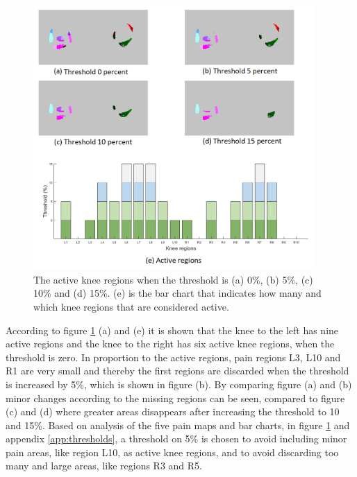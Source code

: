 \begin{figure} [H]
\centering
\includegraphics[width=0.95\textwidth]{figures/threshold4}
\caption{The active knee regions when the threshold is (a) 0\%, (b) 5\%, (c) 10\% and (d) 15\%. (e) is the bar chart that indicates how many and which knee regions that are considered active.}
\label{fig:threshold}
\end{figure}

\noindent
According to figure \ref{fig:threshold} (a) and (e) it is shown that the knee to the left has nine active regions and the knee to the right has six active knee regions, when the threshold is zero. In proportion to the active regions, pain regions L3, L10 and R1 are very small and thereby the first regions are discarded when the threshold is increased by 5\%, which is shown in figure (b).
By comparing figure (a) and (b) minor changes according to the missing regions can be seen, compared to figure (c) and (d) where greater areas disappears after increasing the threshold to 10 and 15\%.
\noindent
Based on analysis of the five pain maps and bar charts, in figure \ref{fig:threshold} and appendix \ref{app:thresholds}, a threshold on 5\% is chosen to avoid including minor pain areas, like region L10, as active knee regions, and to avoid discarding too many and large areas, like regions R3 and R5.


